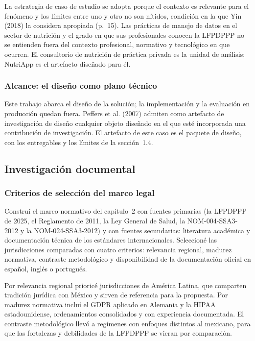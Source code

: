 \documentclass[12pt, a4paper]{article}
\begin{document}
La estrategia de caso de estudio se adopta porque el contexto es
relevante para el fenómeno y los límites entre uno y otro no son
nítidos, condición en la que Yin (2018) la considera apropiada
(p.~15). Las prácticas de manejo de datos en el sector de nutrición y
el grado en que sus profesionales conocen la LFPDPPP no se entienden
fuera del contexto profesional, normativo y tecnológico en que
ocurren. El consultorio de nutrición de práctica privada es la unidad de
análisis; NutriApp es el artefacto diseñado para él.
 
\subsubsection{Alcance: el diseño como plano técnico}
 
Este trabajo abarca el diseño de la solución; la implementación y la
evaluación en producción quedan fuera. Peffers et al. (2007) admiten
como artefacto de investigación de diseño cualquier objeto diseñado en
el que esté incorporada una contribución de investigación. El artefacto
de este caso es el paquete de diseño, con los entregables y los límites de la sección~1.4.
 
\subsection{Investigación documental}
 
\subsubsection{Criterios de selección del marco legal}
 
Construí el marco normativo del capítulo~2 con fuentes primarias
(la LFPDPPP de 2025, el Reglamento de 2011, la Ley General de Salud,
la NOM-004-SSA3-2012 y la NOM-024-SSA3-2012) y con fuentes secundarias:
literatura académica y documentación técnica de los estándares
internacionales. Seleccioné las jurisdicciones comparadas con
cuatro criterios: relevancia regional, madurez normativa, contraste
metodológico y disponibilidad de la documentación oficial en español,
inglés o portugués.
 
Por relevancia regional prioricé jurisdicciones de América
Latina, que comparten tradición jurídica con México y sirven de
referencia para la propuesta. Por madurez normativa incluí el
GDPR aplicado en Alemania y la HIPAA estadounidense, ordenamientos
consolidados y con experiencia documentada. El contraste metodológico
llevó a regímenes con enfoques distintos al mexicano, para que las
fortalezas y debilidades de la LFPDPPP se vieran por comparación.
 
\end{document}
